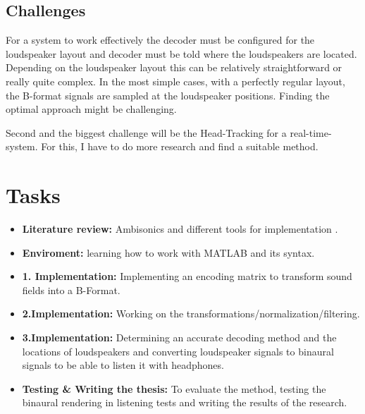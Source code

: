 \documentclass[lang=ngerman,inputenc=utf8,fontsize=10pt]{ldvarticle}
\begin{document}
\subsection{Challenges}
For a system to work effectively the decoder must be configured for the loudspeaker layout and  decoder must be told where the loudspeakers are located. Depending on the loudspeaker layout this can be relatively straightforward or really quite complex. In the most simple cases, with a perfectly regular layout, the B-format signals are sampled at the loudspeaker positions. Finding the optimal approach might be challenging.

Second and the biggest challenge will be the Head-Tracking for a real-time-system. For this, I have to do more research and find a suitable method. 

\section{Tasks}

\begin{itemize}
	\item \textbf{Literature review:} Ambisonics and different tools for implementation .
		
	\item \textbf{Enviroment:} learning how to work with MATLAB and its syntax.
		

		
	\item \textbf{1. Implementation:} Implementing an encoding matrix to transform sound fields into a B-Format.
	\item \textbf{2.Implementation: }Working on the transformations/normalization/filtering.
	\item \textbf{3.Implementation:}	Determining an accurate decoding method and the locations of loudspeakers and converting loudspeaker signals to binaural signals to be able to listen it with headphones.
	\item \textbf{Testing & Writing the thesis:} To evaluate the method, testing the binaural rendering in listening tests and writing the results of the research.
		
\end{itemize}




\end{document}
